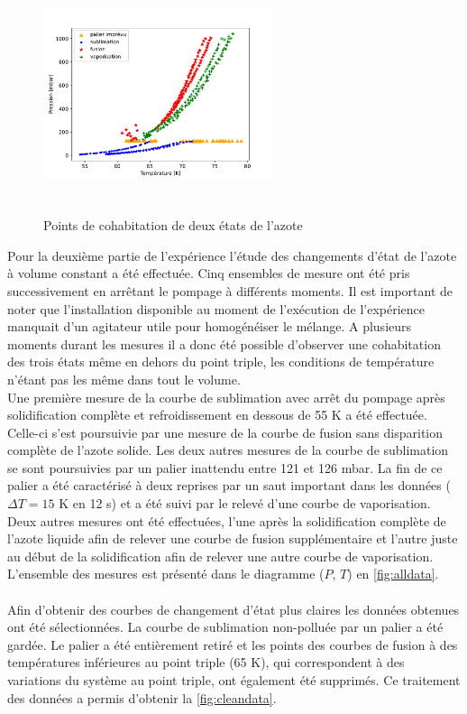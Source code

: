\begin{figure}
    \centering
    \includegraphics[width=0.6\textwidth, height=7cm]{figures/etats_azote_all_data.pdf}
    \caption{Points de cohabitation de deux états de l'azote}
    \label{fig:alldata}
\end{figure}

Pour la deuxième partie de l'expérience l'étude des changements d'état de l'azote à volume constant a été effectuée. Cinq ensembles de mesure ont été pris successivement en arrêtant le pompage à différents moments. Il est important de noter que l'installation disponible au moment de l'exécution de l'expérience manquait d'un agitateur utile pour homogénéiser le mélange. A plusieurs moments durant les mesures il a donc été possible d'observer une cohabitation des trois états même en dehors du point triple, les conditions de température n'étant pas les même dans tout le volume. \\
Une première mesure de la courbe de sublimation avec arrêt du pompage après solidification complète et refroidissement en dessous de 55 \si{\kelvin} a été effectuée. Celle-ci s'est poursuivie par une mesure de la courbe de fusion sans disparition complète de l'azote solide. Les deux autres mesures de la courbe de sublimation se sont poursuivies par un palier inattendu entre 121 et 126 \si{\milli \bar}. La fin de ce palier a été caractérisé à deux reprises par un saut important dans les données (\(\Delta T = 15\) \si{\kelvin} en 12 \si{\second}) et a été suivi par le relevé d'une courbe de vaporisation. Deux autres mesures ont été effectuées, l'une après la solidification complète de l'azote liquide afin de relever une courbe de fusion supplémentaire et l'autre juste au début de la solidification afin de relever une autre courbe de vaporisation. L'ensemble des mesures est présenté dans le diagramme (\(P\), \(T\)) en \autoref{fig:alldata}. \\
\\
Afin d'obtenir des courbes de changement d'état plus claires les données obtenues ont été sélectionnées. La courbe de sublimation non-polluée par un palier a été gardée. Le palier a été entièrement retiré et les points des courbes de fusion à des températures inférieures au point triple (65 \si{\kelvin}), qui correspondent à des variations du système au point triple, ont également été supprimés. Ce traitement des données a permis d'obtenir la \autoref{fig:cleandata}.

